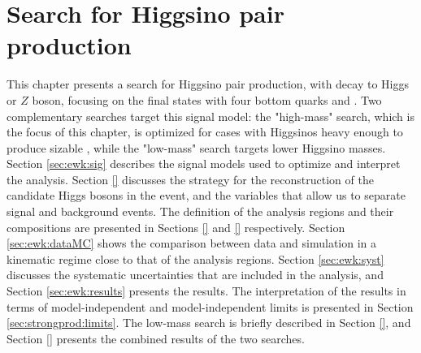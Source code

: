 \chapter{Search for Higgsino pair production}
\label{chap:ewk_prod}

This chapter presents a search for Higgsino pair production, with decay to Higgs or $Z$ boson, 
focusing on the final states with four bottom quarks and \met. 
Two complementary searches target this signal model: the "high-mass" search,
which is the focus of this chapter, is optimized for 
cases with Higgsinos heavy enough to produce sizable \met, while the "low-mass" search 
targets lower Higgsino masses.
Section \ref{sec:ewk:sig} describes the signal models used to optimize and interpret the analysis. 
Section \ref{} discusses the strategy for the reconstruction of the candidate Higgs bosons in the event, 
and the variables that allow us to separate signal and background events. 
The definition of the analysis regions and their compositions are presented in Sections \ref{} and 
\ref{} respectively. 
Section \ref{sec:ewk:dataMC} shows the comparison between data and simulation in a kinematic regime close to that of the analysis regions. 
Section \ref{sec:ewk:syst} discusses the systematic uncertainties that are included in the analysis, and Section \ref{sec:ewk:results} 
presents the results. 
The interpretation of the results in terms of model-independent and model-independent limits is presented in Section \ref{sec:strongprod:limits}. 
The low-mass search is briefly described in Section \ref{}, and Section \ref{} 
presents the combined results of the two searches. 








